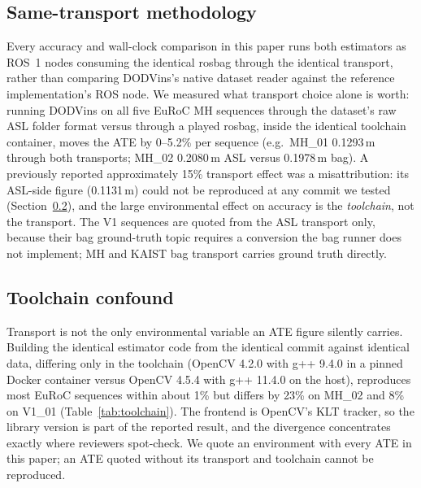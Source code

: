 \documentclass[10pt,conference,letterpaper]{IEEEtran}
\begin{document}
\subsection{Same-transport methodology}
Every accuracy and wall-clock comparison in this paper runs both estimators
as ROS~1 nodes consuming the identical rosbag through the identical
transport, rather than comparing DODVins's native dataset reader
against the reference implementation's ROS node. We measured what transport
choice alone is worth: running DODVins on all five EuRoC MH
sequences through the dataset's raw ASL folder format versus through a
played rosbag, inside the identical toolchain container, moves the ATE by
0--5.2\% per sequence (e.g.\ MH\_01 0.1293\,m through both transports;
MH\_02 0.2080\,m ASL versus 0.1978\,m bag). A previously reported
approximately 15\% transport effect was a misattribution: its ASL-side
figure (0.1131\,m) could not be reproduced at any commit we tested
(Section~\ref{sec:toolchain}), and the large environmental effect on
accuracy is the \emph{toolchain}, not the transport. The V1 sequences are
quoted from the ASL transport only, because their bag ground-truth topic
requires a conversion the bag runner does not implement; MH and KAIST bag
transport carries ground truth directly.

\subsection{Toolchain confound}
\label{sec:toolchain}
Transport is not the only environmental variable an ATE figure silently
carries. Building the identical estimator code from the identical commit
against identical data, differing only in the toolchain (OpenCV 4.2.0 with
g++ 9.4.0 in a pinned Docker container versus OpenCV 4.5.4 with g++ 11.4.0
on the host), reproduces most EuRoC sequences within about 1\% but differs
by 23\% on MH\_02 and 8\% on V1\_01 (Table~\ref{tab:toolchain}). The
frontend is OpenCV's KLT tracker, so the library version is part of the
reported result, and the divergence concentrates exactly where reviewers
spot-check. We quote an environment with every ATE in this paper; an ATE
quoted without its transport and toolchain cannot be reproduced.
\end{document}
